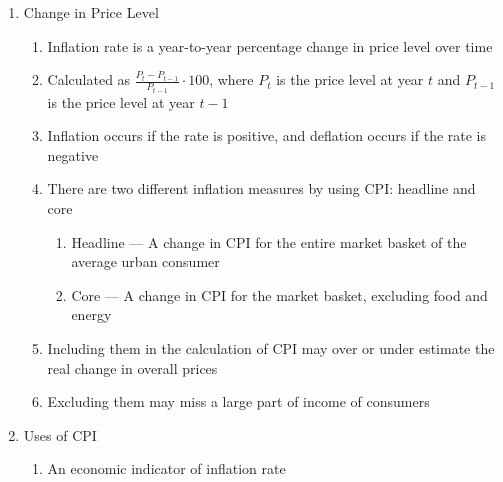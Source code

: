\documentclass[12pt]{article}
\begin{document}
\begin{enumerate}
\begin{enumerate}
\begin{enumerate}
\begin{enumerate}
                \end{enumerate}

            \end{enumerate}

        \end{enumerate}

      \item Change in Price Level

        \begin{enumerate}

          \item Inflation rate is a year-to-year percentage change in price level over time

          \item Calculated as $\frac{P_t-P_{t-1}}{P_{t-1}}\cdot100$, where $P_t$ is the price level at year $t$ and $P_{t-1}$ is the price level at year $t-1$

          \item Inflation occurs if the rate is positive, and deflation occurs if the rate is negative

          \item There are two different inflation measures by using CPI: headline and core

            \begin{enumerate}

              \item Headline — A change in CPI for the entire market basket of the average urban consumer

              \item Core — A change in CPI for the market basket, excluding food and energy

            \end{enumerate}

          \item Including them in the calculation of CPI may over or under estimate the real change in overall prices

          \item Excluding them may miss a large part of income of consumers

        \end{enumerate}

      \item Uses of CPI

        \begin{enumerate}

          \item An economic indicator of inflation rate


\end{enumerate}
\end{enumerate}
\end{document}
